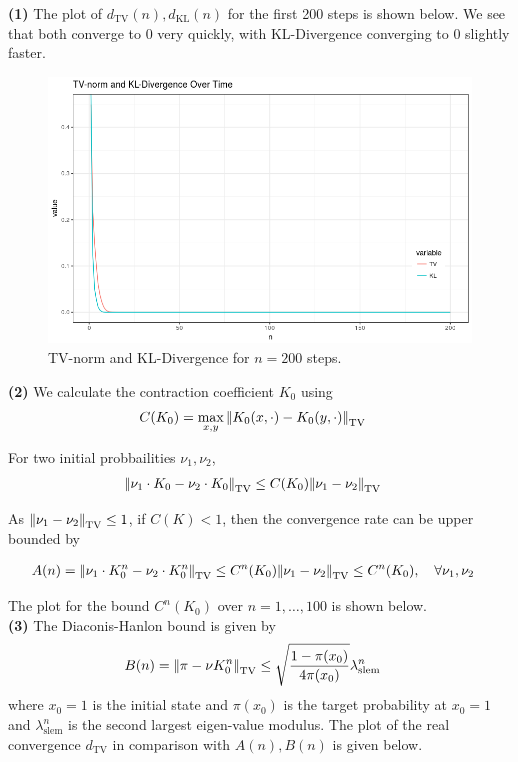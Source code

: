 \documentclass[5pt]{article}
\newcommand{\vertii}[1]{{\left\vert\kern-0.25ex\left\vert #1 
    \right\vert\kern-0.25ex\right\vert}}
\begin{document}
\textbf{(1)} The plot of $d_{\mathrm{TV}}(n), d_{\mathrm{KL}}(n)$ for the first 200 steps is shown below. We see that both converge to 0 very quickly, with KL-Divergence converging to 0 slightly faster. \\

\begin{figure}[H]
\begin{center}
\includegraphics[width = 0.7\columnwidth]{norm_plot}
\caption{TV-norm and KL-Divergence for $n = 200$ steps.}
\end{center}
\end{figure}

\textbf{(2)} We calculate the contraction coefficient $K_0$ using
\begin{align}
	& C(K_0) = \max_{x, y} \vertii{K_0(x, \cdot) - K_0(y, \cdot)}_{\mathrm{TV}}
\end{align}

For two initial probbailities $\nu_1, \nu_2$,
\begin{align}
	& \vertii{\nu_1 \cdot K_0 - \nu_2 \cdot K_0}_{\mathrm{TV}} \leq C(K_0) \vertii{\nu_1 - \nu_2}_{\mathrm{TV}}
\end{align}

As $\vertii{\nu_1 - \nu_2}_{\mathrm{TV}} \leq 1$, if $C(K) < 1$, then the convergence rate can be upper bounded by

\begin{align}
	& A(n) = \vertii{\nu_1 \cdot K_0^n - \nu_{2} \cdot K_0^n}_{\mathrm{TV}} 
	\leq C^n(K_0) \vertii{\nu_1 - \nu_2}_{\mathrm{TV}} \leq C^n(K_0), \quad \forall \nu_1, \nu_2
\end{align}

The plot for the bound $C^n(K_0)$ over $n = 1, \ldots, 100$ is shown below. \\

\textbf{(3)} The Diaconis-Hanlon bound is given by
\begin{align}
	& B(n) = \vertii{\pi - \nu K_0^n}_{\mathrm{TV}} \leq \sqrt{\frac{1 -\pi(x_0)}{4 \pi (x_0)}} \lambda_{\mathrm{slem}}^n
\end{align}
where $x_0 = 1$ is the initial state and $\pi(x_0)$ is the target probability at $x_0 = 1$ and $\lambda_{\mathrm{slem}}^n$ is the second largest eigen-value modulus. The plot of the real convergence $d_{\mathrm{TV}}$ in comparison with $A(n), B(n)$ is given below. \\
\end{document}
